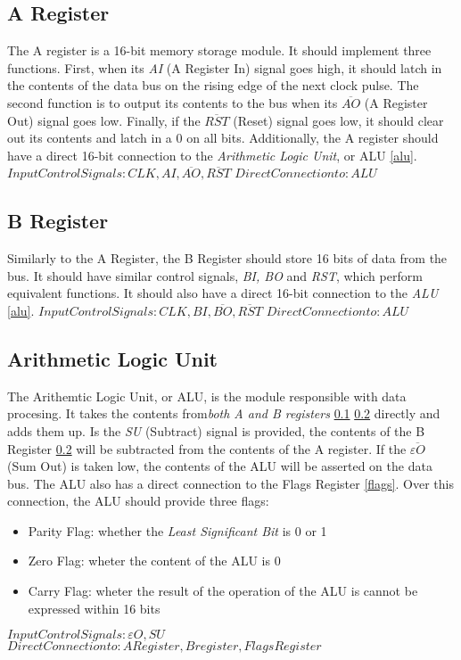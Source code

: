 \subsection{A Register} \label{a-reg}
The A register is a 16-bit memory storage module. It should implement three functions. First, when its \emph{AI}
(A Register In) signal goes high, it should latch in the contents of the data bus on the rising edge of the next clock pulse.
The second function is to output its contents to the bus when its \emph{$\overline{AO}$} (A Register Out) signal goes low. Finally,
if the \emph{$\overline{RST}$} (Reset) signal goes low, it should clear out its contents and latch in a 0 on all bits. Additionally,
the A register should have a direct 16-bit connection to the \emph{Arithmetic Logic Unit}, or ALU \ref{alu}. \\
\textbf{$Input Control Signals: CLK, AI, \overline{AO}, \overline{RST}$}
\textbf{$Direct Connection to: ALU$}

\subsection{B Register} \label{b-reg}
Similarly to the A Register, the B Register should store 16 bits of data from the bus. It should have similar control signals,
\emph{BI, BO} and \emph{RST}, which perform equivalent functions. It should also have a direct 16-bit connection to the \emph{ALU}
\ref{alu}.
\textbf{$Input Control Signals: CLK, BI, \overline{BO}, \overline{RST}$}
\textbf{$Direct Connection to: ALU$}

\subsection{Arithmetic Logic Unit} \label{ALU}
The Arithemtic Logic Unit, or ALU, is the module responsible with data procesing. It takes the contents from\emph{both A and B
registers} \ref{a-reg} \ref{b-reg} directly and adds them up. Is the \emph{SU} (Subtract) signal is provided, the contents of the
B Register \ref{b-reg} will be subtracted from the contents of the A register. If the \emph{$\overline{\varepsilon O}$} (Sum Out)
is taken low, the contents of the  ALU will be asserted on the data bus. The ALU also has a direct connection to the Flags Register
\ref{flags}. Over this connection, the ALU should provide three flags:
\begin{itemize}
  \item Parity Flag: whether the \emph{Least Significant Bit} is 0 or 1
  \item Zero Flag: wheter the content of the ALU is 0
  \item Carry Flag: wheter the result of the operation of the ALU is cannot be expressed within 16 bits
\end{itemize}
\textbf{$Input Control Signals: \varepsilon O, SU$}
\textbf{$Direct Connection to: A Register, B register, Flags Register$}

